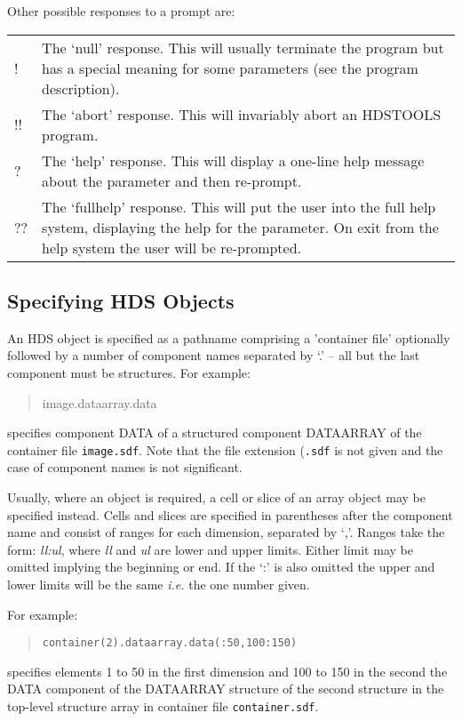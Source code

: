 \documentclass[twoside,11pt]{article}
\renewcommand{\_}{\texttt{\symbol{95}}}
\begin{document}
Other possible responses to a prompt are:\\
\begin{tabular}{p{.25in}p{5.25in}}
! & The `null' response. This will usually terminate the program but has a
special meaning for some parameters (see the program description).\\
!! & The `abort' response. This will invariably abort an HDSTOOLS program.\\
? & The `help' response. This will display a one-line help message about
the parameter and then re-prompt.\\
?? & The `fullhelp' response. This will put the user into the full help
system, displaying the help for the parameter. On exit from the help system
the user will be re-prompted.
\end{tabular}

\subsection{\label{specifying_hds_objects}Specifying HDS Objects}
An HDS object is specified as a pathname comprising a 'container file'
optionally followed by a number of component names separated by `.' -- all but
the last component must be structures. For example:
\begin{quote}
image.data\_array.data
\end{quote}
specifies component DATA of a structured component DATA\_ARRAY of the
container file \texttt{image.sdf}. Note that the file extension (\texttt{.sdf}
is not given and the case of component names is not significant.

Usually, where an object is required, a cell or slice of an array object may be
specified instead. Cells and slices are specified in parentheses after the
component name and consist of ranges for each dimension, separated by `,'.
Ranges take the form: \textit{ll:ul}, where \textit{ll} and \textit{ul} are
lower and upper limits. Either limit may be omitted implying the beginning or
end. If the `:' is also omitted the upper and lower limits will be the same
\textit{i.e.} the one number given.

For example:
\begin{quote}
\texttt{container(2).data\_array.data(:50,100:150)}
\end{quote}
specifies elements 1 to 50 in the first dimension and 100 to 150 in the second
the DATA component of the DATA\_ARRAY structure of the second structure in the
top-level structure array in container file \texttt{container.sdf}.
\end{document}
